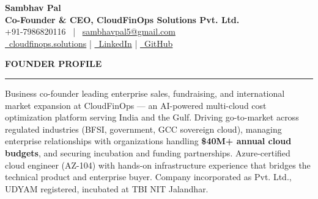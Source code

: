 \documentclass[a4paper,10pt]{article}
\newcommand{\cvsection}[1]{%
  \vspace{2mm}
  \noindent\textbf{\large\MakeUppercase{#1}}
  \vspace{1mm}
  \hrule
  \vspace{1.5mm}
}
\begin{document}
\selectfont

\begin{center}
    {\Huge \textbf{Sambhav Pal}} \\[2pt]
    \textbf{Co-Founder \& CEO, CloudFinOps Solutions Pvt. Ltd.} \\[3pt]
    +91-7986820116 \, | \, \href{mailto:sambhavpal5@gmail.com}{sambhavpal5@gmail.com} \\[2pt]
    \href{https://www.cloudfinops.solutions}{\faGlobe\, cloudfinops.solutions}
    \quad | \quad
    \href{https://linkedin.com/in/sambhav-pal}{\faLinkedin\, LinkedIn}
    \quad | \quad
    \href{https://github.com/Sambhav800}{\faGithub\, GitHub}
\end{center}

\cvsection{Founder Profile}
Business co-founder leading enterprise sales, fundraising, and international market expansion at CloudFinOps --- an AI-powered multi-cloud cost optimization platform serving India and the Gulf. Driving go-to-market across regulated industries (BFSI, government, GCC sovereign cloud), managing enterprise relationships with organizations handling \textbf{\$40M+ annual cloud budgets}, and securing incubation and funding partnerships. Azure-certified cloud engineer (AZ-104) with hands-on infrastructure experience that bridges the technical product and enterprise buyer. Company incorporated as Pvt. Ltd., UDYAM registered, incubated at TBI NIT Jalandhar.
\end{document}
